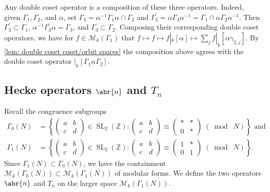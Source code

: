 \documentclass[10pt,leqno,twoside]{article}
\theoremstyle{plain}
\theoremstyle{definition}
\numberwithin{equation}{section}
\numberwithin{lem}{section}
\newcommand{\cbr}[1]{\left\{#1\right\}}
\DeclareMathOperator{\SL}{SL}
\newcommand{\smod}[1]{\;(\bmod\; #1)}
\newcommand{\abcd}{\begin{pmatrix}
    a & b \\ c & d
\end{pmatrix}}
\newcommand{\slz}{\SL_2(\mathbb{Z})}
\begin{document}
Any double coset operator is a composition of these three operators. Indeed, given $\varGamma_1,\varGamma_2$, and $\alpha$, set $\varGamma_3 = \alpha^{-1}\varGamma_1\alpha \cap \varGamma_2$ and $\varGamma_3^\prime = \alpha\varGamma_3\alpha^{-1} = \varGamma_1\cap \alpha\varGamma_2\alpha^{-1}$. Then $\varGamma_3^\prime\subset \varGamma_1$, $\alpha^{-1}\varGamma_3^\prime\alpha = \varGamma_3$, and $\varGamma_3\subset \varGamma_2$. Composing their corresponding double coset operators, we have for  $f\in\mathcal M_k(\varGamma_1)$ that $f\mapsto f\mapsto f|_k[\alpha]\mapsto \sum_j f|_k[\alpha\gamma_{2,j}]$. By \cref{lem: double coset coset/orbit spaces} the composition above agrees with the double coset operator $|_k[\varGamma_1\alpha\varGamma_2]$.
\subsection{Hecke operators $\abr{n}$ and $T_n$}
Recall the congruence subgroups \begin{align*}
    \varGamma_0(N) &= \cbr{\abcd\in\slz: \abcd\equiv\begin{pmatrix}
        \ast & \ast \\ 0 & \ast
    \end{pmatrix}\smod N}\text{ and}\\
    \varGamma_1(N) &= \cbr{\abcd\in \slz: \begin{pmatrix}
        a & b \\ c & d 
    \end{pmatrix}\equiv \begin{pmatrix}
        1 & \ast \\ 0 & 1
    \end{pmatrix}\smod N}.
\end{align*} Since $\varGamma_1(N)\subset 
\varGamma_0(N)$, we have the containment $\mathcal M_k(\varGamma_0(N))\subset \mathcal M_k(\varGamma_1(N))$ of modular forms. We define the two operators $\abr{n}$ and $T_n$ on the larger space $\mathcal M_k(\varGamma_1(N))$.
\end{document}
